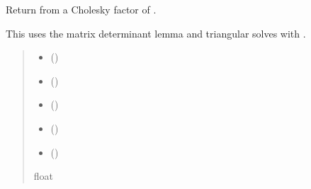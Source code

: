 \documentclass[a4paper,11pt,english]{sphinxmanual}
\begin{document}
\begin{fulllineitems}
\label{\detokenize{generated/cholrot.logdet_rank1:cholrot.logdet_rank1}}
\pysigstartsignatures
\pysiglinewithargsret
{}
{\sphinxparamcomma {}\sphinxparamcomma {}\sphinxparamcomma {}\sphinxparamcomma {}\sphinxparamcomma {}}
{}
\pysigstopsignatures
\sphinxAtStartPar
Return  from a Cholesky factor of .

\sphinxAtStartPar
This uses the matrix determinant lemma and triangular solves with .
\begin{quote}\begin{description}
\begin{itemize}
\item {} 
\sphinxAtStartPar
{} ()

\item {} 
\sphinxAtStartPar
{} ()

\item {} 
\sphinxAtStartPar
{} ()

\item {} 
\sphinxAtStartPar
{} ()

\item {} 
\sphinxAtStartPar
{} ()

\end{itemize}

\sphinxAtStartPar
float

\end{description}\end{quote}

\end{fulllineitems}
\end{document}
